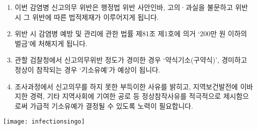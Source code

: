 \begin{enumerate}[첫째,]\tightlist
\item 이번 감염병 신고의무 위반은 행정법 위반 사안인바, 고의·과실을 불문하고 위반 시 그 위반에 따른 법적제재가 이루어지게 됩니다.
\item 위반 시 감염병 예방 및 관리에 관한 법률 제81조 제1호에 의거 ‘200만 원 이하의 벌금’에 처해지게 됩니다.
\item 관할 검찰청에서 신고의무위반 정도가 경미한 경우 ‘약식기소(구약식)’, 경미하고 정상이 참작되는 경우 ‘기소유예’가 예상이 됩니다.
\item 조사과정에서 신고의무를 하지 못한 부득이한 사유를 밝히고, 지역보건발전에 이바지한 경력, 기타 지역사회에 기여한 공로 등 정상참작사유를 적극적으로 제시함으로써 가급적 기소유예가 결정될 수 있도록 노력이 필요합니다.
\end{enumerate}

\texttt{[image: infectionsingo]}
